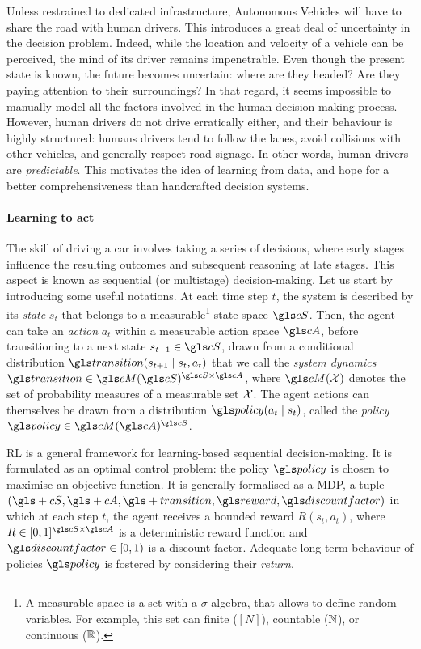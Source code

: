 Unless restrained to dedicated infrastructure, Autonomous Vehicles will have to share the road with human drivers. This introduces a great deal of uncertainty in the decision problem. Indeed, while the location and velocity of a vehicle can be perceived, the mind of its driver remains impenetrable. Even though the present state is known, the future becomes uncertain: where are they headed? Are they paying attention to their surroundings? In that regard, it seems impossible to manually model all the factors involved in the human decision-making process. However, human drivers do not drive erratically either, and their behaviour is highly structured: humans drivers tend to follow the lanes, avoid collisions with other vehicles, and generally respect road signage. In other words, human drivers are \emph{predictable}. This motivates the idea of learning from data, and hope for a better comprehensiveness than handcrafted decision systems.%

\paragraph{Learning to act}

The skill of driving a car involves taking a series of decisions, where early stages influence the resulting outcomes and subsequent reasoning at late stages. This aspect is known as sequential (or multistage) decision-making. Let us start by introducing some useful notations. At each time step $t$, the system is described by its \emph{state} $s_t$ that belongs to a measurable\footnote{A measurable space is a set with a $\sigma$-algebra, that allows to define random variables. For example, this set can finite ($[N]$), countable ($\mathbb{N}$), or continuous ($\mathbb{R}$).} state space $\cS$. Then, the agent can take an \emph{action} $a_t$ within a measurable action space $\cA$, before transitioning to a next state $s_{t+1}\in\cS$, drawn from a conditional distribution $\Ps\parentheses{s_{t+1} \mid s_t, a_t}$ that we call the \emph{system dynamics} $\Ps\in\cM(\cS)^{\cS\times\cA}$, where $\cM(\cX)$ denotes the set of probability measures of a measurable set $\mathcal{X}$. The agent actions can themselves be drawn from a distribution $\policy\parentheses{a_t\mid s_t}$, called the \emph{policy} $\policy\in\cM(\cA)^{\cS}$.

\gls{RL} is a general framework for learning-based sequential decision-making. It is formulated as an optimal control problem: the policy $\policy$ is chosen to maximise an objective function. It is generally formalised as a \gls{MDP}, \ie a tuple $(\gls+{cS}, \gls+{cA}, \gls+{transition}, \R, \discount)$ in which at each step $t$, the agent receives a bounded reward $R(s_t, a_t)$, where $R\in[0, 1]^{\cS\times\cA}$ is a deterministic reward function and $\discount\in[0,1)$ is a discount factor. Adequate long-term behaviour of policies $\policy$ is fostered by considering their \emph{return}.

